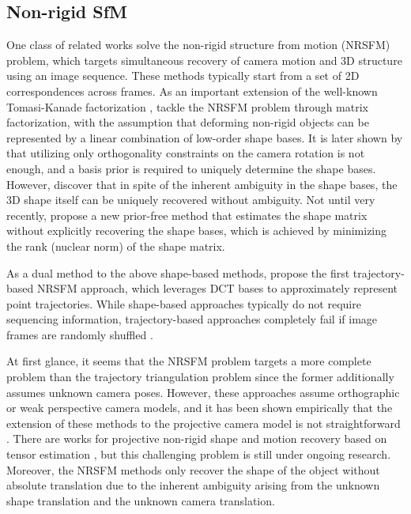 \subsection{Non-rigid SfM}
One class of related works solve the non-rigid structure from motion (NRSFM) problem, which targets simultaneous recovery of camera motion and 3D structure using an image sequence. These methods typically start from a set of 2D correspondences across frames. As an important extension of the well-known Tomasi-Kanade factorization \cite{tomasi1992shape}, \citet{Bregler_CVPR2000} tackle the NRSFM problem through matrix factorization, with the assumption that deforming non-rigid objects can be represented by a linear combination of low-order shape bases. It is later shown by \citet{Xiao_ECCV2004} that utilizing only orthogonality constraints on the camera rotation is not enough, and a basis prior is required to uniquely determine the shape bases. However, \citet{akhter2009defense} discover that in spite of the inherent ambiguity in the shape bases, the 3D shape itself can be uniquely recovered without ambiguity. Not until very recently, \cite{dai2014simple} propose a new prior-free method that estimates the shape matrix without explicitly recovering the shape bases, which is achieved by minimizing the rank (nuclear norm) of the shape matrix. 

As a dual method to the above shape-based methods, \citet{Akhter_NIPS08} propose the first trajectory-based NRSFM approach, which leverages DCT bases to approximately represent point trajectories. While shape-based approaches typically do not require sequencing information, trajectory-based approaches completely fail if image frames are randomly shuffled \cite{dai2014simple}.

At first glance, it seems that the NRSFM problem targets a more complete problem than the trajectory triangulation problem since the former additionally assumes unknown camera poses.
However, these approaches assume orthographic or weak perspective camera models, and it has been shown empirically that the extension of these methods to the projective camera model is not straightforward \cite{Park_ECCV2010}. There are works for projective non-rigid shape and motion recovery based on tensor estimation \cite{hartley2008perspective,vidal2006nonrigid}, but this challenging problem is still under ongoing research. Moreover, the NRSFM methods only recover the shape of the object without absolute translation due to the inherent ambiguity arising from the unknown shape translation and the unknown camera translation. 

